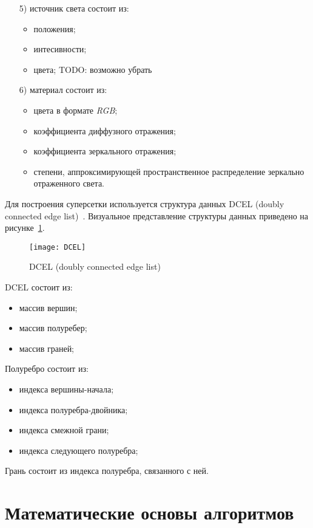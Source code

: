 \begin{enumerate}
	\item[5)] источник света состоит из:
	\begin{itemize}
		\item положения;
		\item интесивности;
		\item цвета; TODO: возможно убрать
	\end{itemize}
	
	\item[6)] материал состоит из:
	\begin{itemize}
		\item цвета в формате \textit{RGB};
		\item коэффициента диффузного отражения;
		\item коэффициента зеркального отражения;
		\item степени, аппроксимирующей пространственное распределение зеркально отраженного света.
	\end{itemize}
\end{enumerate}

Для построения суперсетки используется структура данных DCEL (doubly connected edge list)~\cite{alexa}. Визуальное представление структуры данных приведено на рисунке~\ref{fig:DCEL}.

\begin{figure}[H]
	\centering
	\texttt{[image: DCEL]}
	\label{fig:DCEL}
	\caption{DCEL (doubly connected edge list)~\cite{alexa}}
\end{figure}

DCEL состоит из:

\begin{itemize}
	\item массив вершин;
	\item массив полуребер;
	\item массив граней;
\end{itemize}

Полуребро состоит из:
\begin{itemize}
	\item индекса вершины-начала;
	\item индекса полуребра-двойника;
	\item индекса смежной грани;
	\item индекса следующего полуребра;
\end{itemize}

Грань состоит из индекса полуребра, связанного с ней.

\section{Математические основы алгоритмов}

